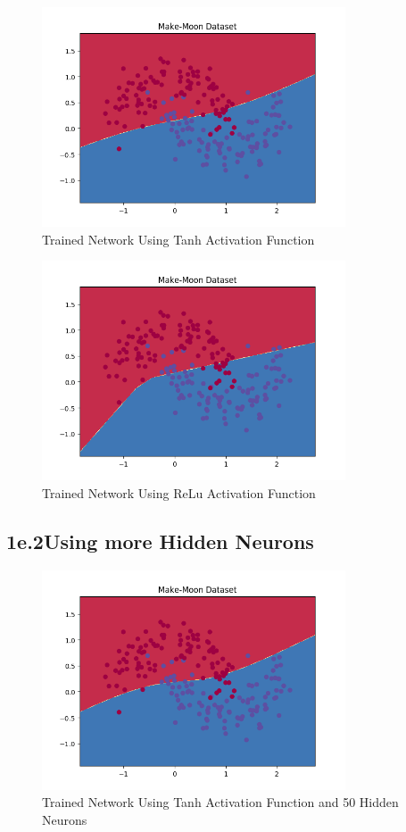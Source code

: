 \documentclass{article}
\begin{document}
		\begin{figure}[!htb]
		\centering
		\includegraphics[width=90mm]{figures/tanh.png}
		\caption{Trained Network Using Tanh Activation Function}
	\end{figure}

	\begin{figure}[!htb]
		\centering
		\includegraphics[width=90mm]{figures/relu.png}
		\caption{Trained Network Using ReLu Activation Function}
	\end{figure}

\subsection*{1e.2Using more Hidden Neurons}

	\begin{figure}[ht]
		\centering
		\includegraphics[width=90mm]{figures/tanh_nnh50.png}
		\caption{Trained Network Using Tanh Activation Function and 50 Hidden Neurons}
	\end{figure}
	
\end{document}
